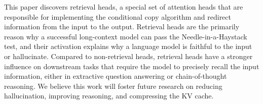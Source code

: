 This paper discovers retrieval heads, a special set of attention heads that are responsible for implementing the conditional copy algorithm and redirect information from the input to the output. 
Retrieval heads are the primarily reason why a successful long-context model can pass the Needle-in-a-Haystack test, and their activation explains why a language model is faithful to the input or hallucinate.
Compared to non-retrieval heads, retrieval heads have a stronger influence on downstream tasks that require the model to precisely recall the input information, either in extractive question answering or chain-of-thought reasoning. 
We believe this work will foster future research on reducing hallucination,
improving reasoning, and compressing the KV cache. 